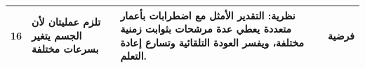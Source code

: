 {\begin{longtable}{>{\raggedright}p{0.5cm}>{\raggedright}p{4.0cm}>{\raggedright}p{5.6cm}>{\raggedright}p{2.3cm}>{\raggedright\arraybackslash}p{1.7cm}}
16 & تلزم عمليتان لأن الجسم يتغير بسرعات مختلفة & نظرية: التقدير الأمثل مع اضطرابات بأعمار متعددة يعطي عدة مرشحات بثوابت زمنية مختلفة، ويفسر العودة التلقائية وتسارع إعادة التعلم. & \cite{Kording2007} & فرضية \\
\bottomrule
\end{longtable}}
